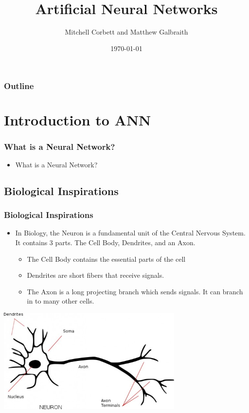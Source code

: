 \documentclass{beamer}
\title[Artifical Neural Networks]
{Artificial Neural Networks}
\subtitle{}
\date{\today}
\author[Mitchell Corbett/Matthew Galbraith]{Mitchell Corbett and Matthew Galbraith}
\begin{document}
 
 
\maketitle


\expandafter\def\expandafter\insertshorttitle\expandafter{%
  \insertshorttitle\hfill%
  \insertframenumber\,/\,\inserttotalframenumber}

\begin{frame}
  \frametitle{Outline}
  \tableofcontents[pausesections]
\end{frame}

\section{Introduction to ANN}
\begin{frame}
\frametitle{What is a Neural Network?}

\begin{itemize}
	\item What is a Neural Network?
    
\end{itemize}
\end{frame}
\subsection{Biological Inspirations}
\begin{frame}
\frametitle{Biological Inspirations}
\begin{itemize}
	\item In Biology, the Neuron is a fundamental unit of the Central Nervous System. It contains 3 parts. The Cell Body, Dendrites, and an Axon.
	\begin{itemize}
		\item The Cell Body contains the essential parts of the cell
		\item Dendrites are short fibers that receive signals.
		\item The Axon is a long projecting branch which sends signals. It can branch in to many other cells.
\end{itemize}
\end{itemize}
\end{frame}
\begin{frame}
\includegraphics[width = 350px]{neuron.jpg}
\end{frame}
\end{document}
